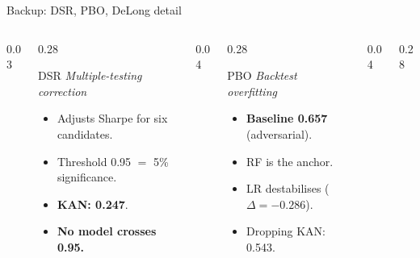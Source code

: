 \documentclass[aspectratio=169, t]{beamer}
\begin{document}
\begin{frame}{Backup: DSR, PBO, DeLong detail}
\vspace{-0.6em}

\begin{columns}[T]
\begin{column}{0.03\textwidth}\hfill\end{column}
\begin{column}{0.28\textwidth}
{
\begin{block}{DSR}
\footnotesize
\textit{Multiple-testing correction}
\begin{itemize}\setlength{\itemsep}{0pt}
  \item Adjusts Sharpe for six candidates.
  \item Threshold 0.95 $=$ 5\% significance.
  \item \textbf{KAN: 0.247}.
  \item \textbf{No model crosses 0.95.}
\end{itemize}
\end{block}
}
\end{column}
\begin{column}{0.04\textwidth}\hfill\end{column}
\begin{column}{0.28\textwidth}
{
\begin{block}{PBO}
\footnotesize
\textit{Backtest overfitting}
\begin{itemize}\setlength{\itemsep}{0pt}
  \item \textbf{Baseline 0.657} (adversarial).
  \item RF is the anchor.
  \item LR destabilises ($\Delta = -0.286$).
  \item Dropping KAN: 0.543.
\end{itemize}
\end{block}
}
\end{column}
\begin{column}{0.04\textwidth}\hfill\end{column}
\begin{column}{0.28\textwidth}
{
}
\end{column}
\end{columns}
\end{frame}
\end{document}
